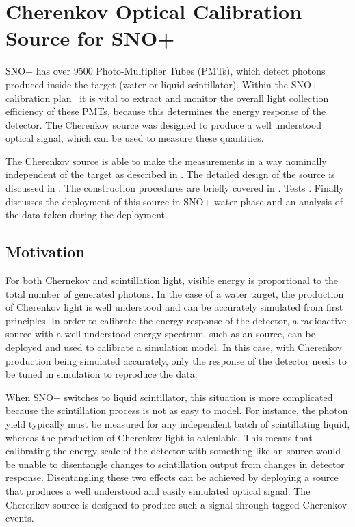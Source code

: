 \renewcommand{\bf}{\bfseries}

\chapter{Cherenkov Optical Calibration Source for SNO+}
\label{ch:chsrc}

SNO+ has over 9500 Photo-Multiplier Tubes (PMTs), which detect photons produced inside the target (water or liquid scintillator).
Within the SNO+ calibration plan~\cite{gann:2013} it is vital to extract and monitor the overall light collection efficiency of these PMTs, because this determines the energy response of the detector.
The Cherenkov source was designed to produce a well understood optical signal, which can be used to measure these quantities.

The Cherenkov source is able to make the measurements in a way nominally independent of the target as described in . 
The detailed design of the source is discussed in . 
The construction procedures are briefly covered in .
Tests  .
Finally  discusses the deployment of this source in SNO+ water phase and an analysis of the data taken during the deployment.

\section{Motivation}
\label{chap:motivation}

For both Chernekov and scintillation light, visible energy is proportional to the total number of generated photons.
In the case of a water target, the production of Cherenkov light is well understood and can be accurately simulated from first principles.
In order to calibrate the energy response of the detector, a radioactive source with a well understood energy spectrum, such as an \N source, can be deployed and used to calibrate a simulation model.
In this case, with Cherenkov production being simulated accurately, only the response of the detector needs to be tuned in simulation to reproduce the data.

When SNO+ switches to liquid scintillator, this situation is more complicated because the scintillation process is not as easy to model.
For instance, the photon yield typically must be measured for any independent batch of scintillating liquid, whereas the production of Cherenkov light is calculable. 
This means that calibrating the energy scale of the detector with something like an \N source would be unable to disentangle changes to scintillation output from changes in detector response.
Disentangling these two effects can be achieved by deploying a source that produces a well understood and easily simulated optical signal. 
The Cherenkov source is designed to produce such a signal through tagged Cherenkov events.


